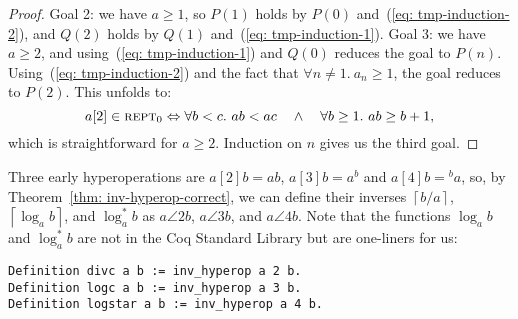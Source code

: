 \begin{proof}
Goal 2: we have $a \ge 1$, so
$P(1)$ holds by $P(0)$ and~(\ref{eq: tmp-induction-2}), and
$Q(2)$ holds by $Q(1)$ and~(\ref{eq: tmp-induction-1}).
Goal 3: we have $a\ge 2$, and using~(\ref{eq: tmp-induction-1}) and $Q(0)$
reduces the goal to $P(n)$. Using~(\ref{eq: tmp-induction-2}) and the fact that $\forall n \neq 1.~a_n\ge 1$, the goal reduces to $P(2)$. This unfolds to:
\begin{equation*}
a[2]\in \text{\scshape{rept}}_0 \Leftrightarrow \forall b < c.~ab < ac \quad \wedge \quad \forall b \ge 1.~ab \ge b+1\text{,}
\end{equation*}
which is straightforward for $a\ge 2$. Induction on $n$ gives us the third goal.
\end{proof}
\begin{rem}
Three early hyperoperations are $a[2]b = ab$, $a[3]b = a^b$ and
$a[4]b = \! ^ba$, so, by Theorem~\ref{thm: inv-hyperop-correct}, we can define their inverses $\left\lceil b/a \right\rceil$, $\left\lceil \log_a b \right\rceil$, and $\log^*_a b$ as	
\href{https://github.com/inv-ack/inv-ack/blob/7270e64a2600b771f2b1b1b151f7d13fb2ae6c97/applications.v#L102-L113}{\color{blue}$a\angle{2}b$},	
\href{https://github.com/inv-ack/inv-ack/blob/7270e64a2600b771f2b1b1b151f7d13fb2ae6c97/applications.v#L115-L124}{\color{blue}$a\angle{3}b$}, and	
\href{https://github.com/inv-ack/inv-ack/blob/7270e64a2600b771f2b1b1b151f7d13fb2ae6c97/applications.v#L126-L128}{\color{blue}$a\angle{4}b$}.
Note that the functions $\log_a b$ and $\log^*_a b$ are not in the Coq Standard Library but are one-liners for us:

\begin{lstlisting}
Definition divc a b := inv_hyperop a 2 b.
Definition logc a b := inv_hyperop a 3 b.
Definition logstar a b := inv_hyperop a 4 b.
\end{lstlisting}
\end{rem}



